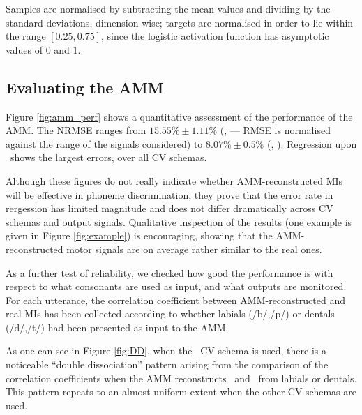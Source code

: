 Samples are normalised by subtracting the mean values
and dividing by the standard deviations, dimension-wise; targets are
normalised in order to lie within the range $[0.25,0.75]$, since the
logistic activation function has asymptotic values of $0$ and $1$.

\subsection{Evaluating the AMM}
\label{subsec:amm_results}

Figure \ref{fig:amm_perf} shows a quantitative assessment of the performance
of the AMM. The NRMSE ranges from $15.55\% \pm 1.11\%$ (\vlio, \coa ---
RMSE is normalised against the range of the signals considered) to
$8.07\% \pm 0.5\%$ (\vttu, \spkc). Regression upon \vlio\ shows the largest
errors, over all CV schemas.

Although these figures do not really indicate whether AMM-reconstructed MIs will be
effective in phoneme discrimination, they prove that the error rate in rergession has
limited magnitude and does not differ dramatically across CV schemas and output signals.
Qualitative inspection of the results (one example is given in Figure \ref{fig:example})
is encouraging, showing that the AMM-reconstructed motor signals are on average rather
similar to the real ones.

As a further test of reliability, we checked how good the performance is with respect
to what consonants are used as input, and what outputs are monitored. For each utterance,
the correlation coefficient between AMM-reconstructed and real MIs has been collected
according to whether labials (/b/,/p/) or dentals (/d/,/t/) had been presented as input
to the AMM.

As one can see in Figure \ref{fig:DD}, when the \overall\ CV schema is used,
there is a noticeable ``double dissociation''
pattern arising from the comparison of the correlation coefficients when the AMM
reconstructs \vlio\ and \vttu\ from labials or dentals. This pattern repeats to an
almost uniform extent when the other CV schemas are used.
